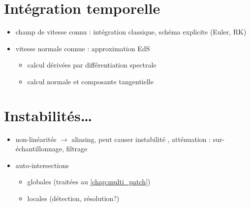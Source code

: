 \section{Intégration temporelle}%
\begin{itemize}
	\item champ de vitesse connu : intégration classique, schéma explicite (Euler, RK)
	\item vitesse normale connue : approximation EdS
	\begin{itemize}
		\item calcul dérivées par différentiation spectrale
		\item calcul normale et composante tangentielle
	\end{itemize}
\end{itemize}


\section{Instabilités\ldots}
\label{sec:instabilites}
\begin{itemize}
	\item non-linéarités $\to$ aliasing, peut causer instabilité \cite{rahimian2015}, atténuation : sur-échantillonnage, filtrage
	\item auto-intersections
	\begin{itemize}
		\item globales (traitées au \autoref{chap:multi_patch})
		\item locales \cite{farouki1986} (détection, résolution?)
	\end{itemize}
\end{itemize}
